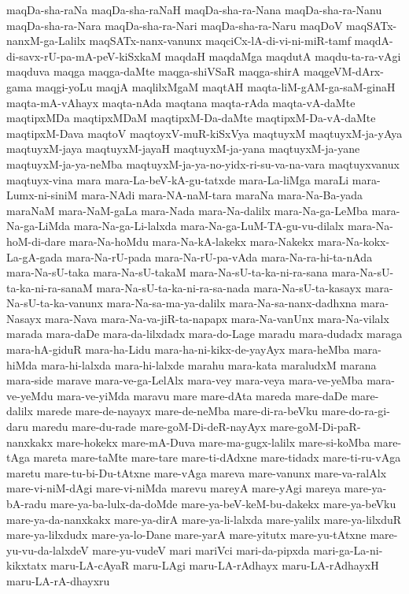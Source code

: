 {maqDa-sha-raNa
maqDa-sha-raNaH
maqDa-sha-ra-Nana
maqDa-sha-ra-Nanu
maqDa-sha-ra-Nara
maqDa-sha-ra-Nari
maqDa-sha-ra-Naru
maqDoV
maqSATx-nanxM-ga-Lalilx
maqSATx-nanx-vanunx
maqciCx-lA-di-vi-ni-miR-tamf
maqdA-di-savx-rU-pa-mA-peV-kiSxkaM
maqdaH
maqdaMga
maqdutA
maqdu-ta-ra-vAgi
maqduva
maqga
maqga-daMte
maqga-shiVSaR
maqga-shirA
maqgeVM-dArx-gama
maqgi-yoLu
maqjA
maqlilxMgaM
maqtAH
maqta-liM-gAM-ga-saM-ginaH
maqta-mA-vAhayx
maqta-nAda
maqtana
maqta-rAda
maqta-vA-daMte
maqtipxMDa
maqtipxMDaM
maqtipxM-Da-daMte
maqtipxM-Da-vA-daMte
maqtipxM-Dava
maqtoV
maqtoyxV-muR-kiSxVya
maqtuyxM
maqtuyxM-ja-yAya
maqtuyxM-jaya
maqtuyxM-jayaH
maqtuyxM-ja-yana
maqtuyxM-ja-yane
maqtuyxM-ja-ya-neMba
maqtuyxM-ja-ya-no-yidx-ri-su-va-na-vara
maqtuyxvanux
maqtuyx-vina
mara
mara-La-beV-kA-gu-tatxde
mara-La-liMga
maraLi
mara-Lumx-ni-siniM
mara-NAdi
mara-NA-naM-tara
maraNa
mara-Na-Ba-yada
maraNaM
mara-NaM-gaLa
mara-Nada
mara-Na-dalilx
mara-Na-ga-LeMba
mara-Na-ga-LiMda
mara-Na-ga-Li-lalxda
mara-Na-ga-LuM-TA-gu-vu-dilalx
mara-Na-hoM-di-dare
mara-Na-hoMdu
mara-Na-kA-lakekx
mara-Nakekx
mara-Na-kokx-La-gA-gada
mara-Na-rU-pada
mara-Na-rU-pa-vAda
mara-Na-ra-hi-ta-nAda
mara-Na-sU-taka
mara-Na-sU-takaM
mara-Na-sU-ta-ka-ni-ra-sana
mara-Na-sU-ta-ka-ni-ra-sanaM
mara-Na-sU-ta-ka-ni-ra-sa-nada
mara-Na-sU-ta-kasayx
mara-Na-sU-ta-ka-vanunx
mara-Na-sa-ma-ya-dalilx
mara-Na-sa-nanx-dadhxna
mara-Nasayx
mara-Nava
mara-Na-va-jiR-ta-napapx
mara-Na-vanUnx
mara-Na-vilalx
marada
mara-daDe
mara-da-lilxdadx
mara-do-Lage
maradu
mara-dudadx
maraga
mara-hA-giduR
mara-ha-Lidu
mara-ha-ni-kikx-de-yayAyx
mara-heMba
mara-hiMda
mara-hi-lalxda
mara-hi-lalxde
marahu
mara-kata
maraludxM
marana
mara-side
marave
mara-ve-ga-LelAlx
mara-vey
mara-veya
mara-ve-yeMba
mara-ve-yeMdu
mara-ve-yiMda
maravu
mare
mare-dAta
mareda
mare-daDe
mare-dalilx
marede
mare-de-nayayx
mare-de-neMba
mare-di-ra-beVku
mare-do-ra-gi-daru
maredu
mare-du-rade
mare-goM-Di-deR-nayAyx
mare-goM-Di-paR-nanxkakx
mare-hokekx
mare-mA-Duva
mare-ma-gugx-lalilx
mare-si-koMba
mare-tAga
mareta
mare-taMte
mare-tare
mare-ti-dAdxne
mare-tidadx
mare-ti-ru-vAga
maretu
mare-tu-bi-Du-tAtxne
mare-vAga
mareva
mare-vanunx
mare-va-ralAlx
mare-vi-niM-dAgi
mare-vi-niMda
marevu
mareyA
mare-yAgi
mareya
mare-ya-bA-radu
mare-ya-ba-lulx-da-doMde
mare-ya-beV-keM-bu-dakekx
mare-ya-beVku
mare-ya-da-nanxkakx
mare-ya-dirA
mare-ya-li-lalxda
mare-yalilx
mare-ya-lilxduR
mare-ya-lilxdudx
mare-ya-lo-Dane
mare-yarA
mare-yitutx
mare-yu-tAtxne
mare-yu-vu-da-lalxdeV
mare-yu-vudeV
mari
mariVci
mari-da-pipxda
mari-ga-La-ni-kikxtatx
maru-LA-cAyaR
maru-LAgi
maru-LA-rAdhayx
maru-LA-rAdhayxH
maru-LA-rA-dhayxru
}
